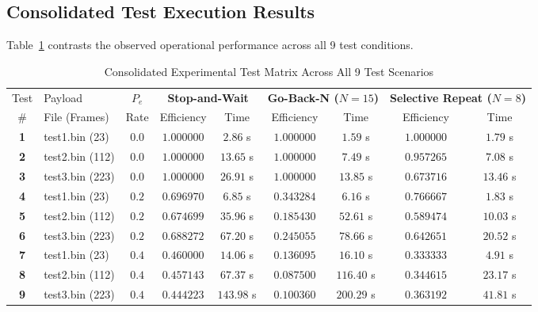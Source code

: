\documentclass[11pt,a4paper]{article}
\begin{document}
\subsection{Consolidated Test Execution Results}
Table~\ref{tab:test_summary} contrasts the observed operational performance across all 9 test conditions.
\begin{table}[htbp]
\centering
\scriptsize
\renewcommand{\arraystretch}{1.18}
\begin{tabular}{c l c | c c | c c | c c}
\rowcolor{tableheader}
\color{white}Test & \color{white}Payload & \color{white}$P_e$ & \multicolumn{2}{c|}{\color{white}\textbf{Stop-and-Wait}} & \multicolumn{2}{c|}{\color{white}\textbf{Go-Back-N ($N=15$)}} & \multicolumn{2}{c}{\color{white}\textbf{Selective Repeat ($N=8$)}} \\
\rowcolor{tableheader}
\color{white}\# & \color{white}File (Frames) & \color{white}Rate & \color{white}Efficiency & \color{white}Time & \color{white}Efficiency & \color{white}Time & \color{white}Efficiency & \color{white}Time \\
\hline
\textbf{1} & test1.bin (23) & $0.0$ & $1.000000$ & $2.86$ s & $1.000000$ & $1.59$ s & $1.000000$ & $1.79$ s \\
\textbf{2} & test2.bin (112) & $0.0$ & $1.000000$ & $13.65$ s & $1.000000$ & $7.49$ s & $0.957265$ & $7.08$ s \\
\textbf{3} & test3.bin (223) & $0.0$ & $1.000000$ & $26.91$ s & $1.000000$ & $13.85$ s & $0.673716$ & $13.46$ s \\
\hline
\rowcolor{softblue!25} \textbf{4} & test1.bin (23) & $0.2$ & $0.696970$ & $6.85$ s & $0.343284$ & $6.16$ s & $0.766667$ & $1.83$ s \\
\rowcolor{softblue!25} \textbf{5} & test2.bin (112) & $0.2$ & $0.674699$ & $35.96$ s & $0.185430$ & $52.61$ s & $0.589474$ & $10.03$ s \\
\rowcolor{softblue!25} \textbf{6} & test3.bin (223) & $0.2$ & $0.688272$ & $67.20$ s & $0.245055$ & $78.66$ s & $0.642651$ & $20.52$ s \\
\hline
\rowcolor{lightgold} \textbf{7} & test1.bin (23) & $0.4$ & $0.460000$ & $14.06$ s & $0.136095$ & $16.10$ s & $0.333333$ & $4.91$ s \\
\rowcolor{lightgold} \textbf{8} & test2.bin (112) & $0.4$ & $0.457143$ & $67.37$ s & $0.087500$ & $116.40$ s & $0.344615$ & $23.17$ s \\
\rowcolor{lightgold} \textbf{9} & test3.bin (223) & $0.4$ & $0.444223$ & $143.98$ s & $0.100360$ & $200.29$ s & $0.363192$ & $41.81$ s \\
\bottomrule
\end{tabular}
\caption{Consolidated Experimental Test Matrix Across All 9 Test Scenarios}
\label{tab:test_summary}
\end{table}
\end{document}
